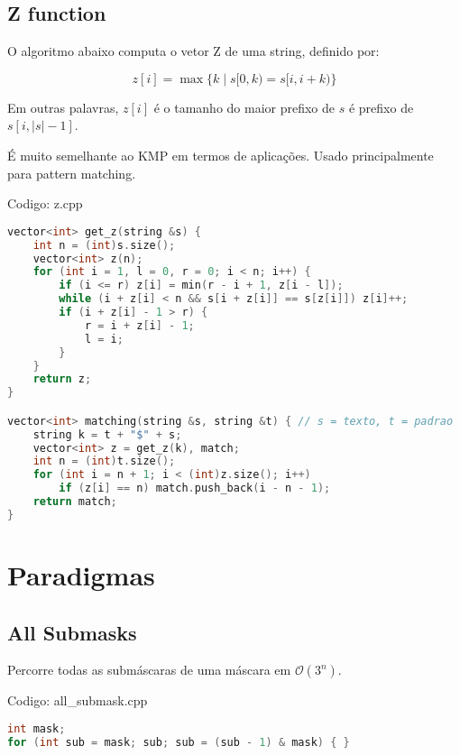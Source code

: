 \documentclass[10pt, a4paper, oneside]{book}
\begin{document}
\section{Z function}


O algoritmo abaixo computa o vetor Z de uma string, definido por:



$$ z[i] = \max\{k \mid s[0,k) = s[i,i+k)\} $$



Em outras palavras, $z[i]$ é o tamanho do maior prefixo de $s$ é prefixo de $s[i,|s|-1]$.



É muito semelhante ao KMP em termos de aplicações. Usado principalmente para pattern matching.
\hfill

Codigo: z.cpp

\begin{lstlisting}[language=C++]
vector<int> get_z(string &s) {
    int n = (int)s.size();
    vector<int> z(n);
    for (int i = 1, l = 0, r = 0; i < n; i++) {
        if (i <= r) z[i] = min(r - i + 1, z[i - l]);
        while (i + z[i] < n && s[i + z[i]] == s[z[i]]) z[i]++;
        if (i + z[i] - 1 > r) {
            r = i + z[i] - 1;
            l = i;
        }
    }
    return z;
}

vector<int> matching(string &s, string &t) { // s = texto, t = padrao
    string k = t + "$" + s;
    vector<int> z = get_z(k), match;
    int n = (int)t.size();
    for (int i = n + 1; i < (int)z.size(); i++)
        if (z[i] == n) match.push_back(i - n - 1);
    return match;
}\end{lstlisting}
\hfill

\newpage

%
%
%
%

\chapter{Paradigmas}

\section{All Submasks}


Percorre todas as submáscaras de uma máscara em $\mathcal{O}(3^n)$.

\hfill

Codigo: all\_submask.cpp

\begin{lstlisting}[language=C++]
int mask;
for (int sub = mask; sub; sub = (sub - 1) & mask) { }
\end{lstlisting}
\hfill
\end{document}
